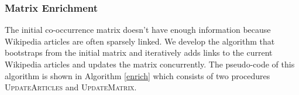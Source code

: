 \subsubsection{Matrix Enrichment}
The initial co-occurrence matrix doesn't have enough information
because Wikipedia articles are often sparsely linked.
We develop the algorithm that bootstraps from the initial matrix and iteratively
adds links to the current Wikipedia articles and updates the matrix
concurrently. The pseudo-code of this algorithm is shown in
Algorithm \ref{enrich} which consists of two procedures
\textsc{UpdateArticles} and \textsc{UpdateMatrix}.

